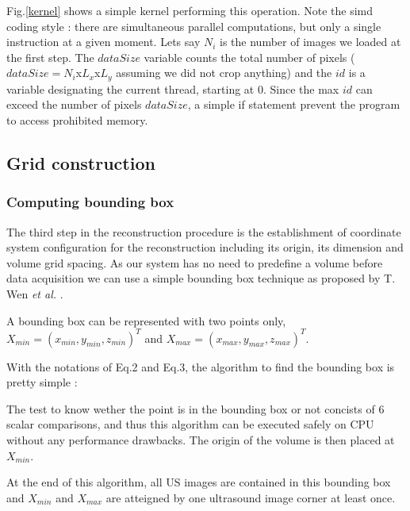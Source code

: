 \documentclass[12pt,journal,compsoc]{IEEEtran}
\begin{document}
Fig.\ref{kernel} shows a simple kernel performing this operation. Note the \ac{simd} coding style : there are simultaneous parallel computations, but only a single instruction at a given moment. Lets say $N_i$ is the number of images we loaded at the first step. 
The $dataSize$ variable counts the total number of pixels ($dataSize=N_i$x$L_x$x$L_y$ assuming we did not crop anything) and the $id$ is a variable designating the current thread, starting at 0. Since the max $id$ can exceed the number of pixels $dataSize$, a simple if statement prevent the program to access prohibited memory. 

\subsection{Grid construction}

\subsubsection{Computing bounding box}
The third step in the reconstruction procedure is the establishment of coordinate system configuration for the reconstruction including its origin, its dimension and volume grid spacing. As our system has no need to predefine a volume before data acquisition we can use a simple bounding box technique as proposed by T. Wen \textit{et al.} \cite{2}.

A bounding box can be represented with two points only, $X_{min} = (x_{min},y_{min},z_{min})^T$ and $X_{max} = (x_{max}, y_{max}, z_{max})^T$.

With the notations of Eq.2 and Eq.3, the algorithm to find the bounding box is pretty simple :

\begin{algorithm}
\end{algorithm}
	
The test to know wether the point is in the bounding box or not concists of 6 scalar comparisons, and thus this algorithm can be executed safely on CPU without any performance drawbacks.
The origin of the volume is then placed at $X_{min}$.

At the end of this algorithm, all US images are contained in this bounding box and $X_{min}$ and $X_{max}$ are atteigned by one ultrasound image corner at least once.
\end{document}
